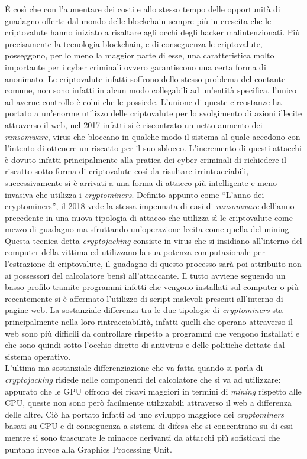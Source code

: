 \documentclass[
11pt, %
oneside, %
english, %
onehalfspacing,%
headsepline, %
]{MastersDoctoralThesis} %
\begin{document}
È così che con l'aumentare dei costi e allo stesso tempo delle opportunità di guadagno offerte dal mondo delle blockchain sempre più in crescita che le criptovalute hanno iniziato a risaltare agli occhi degli hacker malintenzionati. Più precisamente la tecnologia blockchain, e di conseguenza le criptovalute, posseggono, per lo meno la maggior parte di esse, una caratteristica molto importante per i cyber criminali ovvero garantiscono una certa forma di anonimato. Le criptovalute infatti soffrono dello stesso problema del contante comune, non sono infatti in alcun modo collegabili ad un'entità specifica, l'unico ad averne controllo è colui che le possiede. L'unione di queste circostanze ha portato a un'enorme utilizzo delle criptovalute per lo svolgimento di azioni illecite attraverso il web, nel 2017 infatti si è riscontrato un netto aumento dei \emph{ransomware}, virus che bloccano in qualche modo il sistema al quale accedono con l'intento di ottenere un riscatto per il suo sblocco. L'incremento di questi attacchi è dovuto infatti principalmente alla pratica dei cyber criminali di richiedere il riscatto sotto forma di criptovalute così da risultare irrintracciabili, successivamente si è arrivati a una forma di attacco più intelligente e meno invasiva che utilizza i \emph{cryptominers}. Definito appunto come ``L'anno dei cryptominers'', il 2018 vede la stessa impennata di casi di \emph{ransomware} dell'anno precedente in una nuova tipologia di attacco che utilizza sì le criptovalute come mezzo di guadagno ma sfruttando un'operazione lecita come quella del mining. Questa tecnica detta \emph{cryptojacking} consiste in virus che si insidiano all'interno del computer della vittima ed utilizzano la sua potenza computazionale per l'estrazione di criptovalute, il guadagno di questo processo sarà poi attribuito non ai possessori del calcolatore bensì all'attaccante. Il tutto avviene seguendo un basso profilo tramite programmi infetti che vengono installati sul computer o più recentemente si è affermato l'utilizzo di script malevoli presenti all'interno di pagine web. La sostanziale differenza tra le due tipologie di \emph{cryptominers} sta principalmente nella loro rintracciabilità, infatti quelli che operano attraverso il web sono più difficili da controllare rispetto a programmi che vengono installati e che sono quindi sotto l'occhio diretto di antivirus e delle politiche dettate dal sistema operativo.\\
L'ultima ma sostanziale differenziazione che va fatta quando si parla di \emph{cryptojacking} risiede nelle componenti del calcolatore che si va ad utilizzare: appurato che le GPU offrono dei ricavi maggiori in termini di \emph{mining} rispetto alle CPU, queste non sono però facilmente utilizzabili attraverso il web a differenza delle altre. Ciò ha portato infatti ad uno sviluppo maggiore dei \emph{cryptominers} basati su CPU e di conseguenza a sistemi di difesa che si concentrano su di essi mentre si sono trascurate le minacce derivanti da attacchi più sofisticati che puntano invece alla Graphics Processing Unit.
\end{document}
